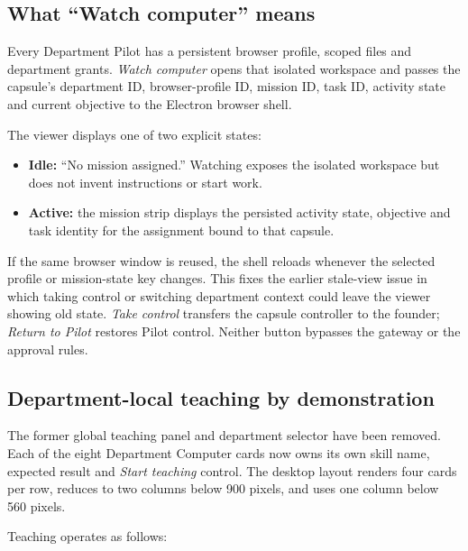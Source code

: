 \subsection*{What ``Watch computer'' means}

Every Department Pilot has a persistent browser profile, scoped files and
department grants. \emph{Watch computer} opens that isolated workspace and
passes the capsule's department ID, browser-profile ID, mission ID, task ID,
activity state and current objective to the Electron browser shell.

The viewer displays one of two explicit states:

\begin{itemize}[leftmargin=*]
\item \textbf{Idle:} ``No mission assigned.'' Watching exposes the isolated
workspace but does not invent instructions or start work.
\item \textbf{Active:} the mission strip displays the persisted activity state,
objective and task identity for the assignment bound to that capsule.
\end{itemize}

If the same browser window is reused, the shell reloads whenever the selected
profile or mission-state key changes. This fixes the earlier stale-view issue
in which taking control or switching department context could leave the viewer
showing old state. \emph{Take control} transfers the capsule controller to the
founder; \emph{Return to Pilot} restores Pilot control. Neither button bypasses
the gateway or the approval rules.

\subsection*{Department-local teaching by demonstration}

The former global teaching panel and department selector have been removed.
Each of the eight Department Computer cards now owns its own skill name,
expected result and \emph{Start teaching} control. The desktop layout renders
four cards per row, reduces to two columns below 900 pixels, and uses one
column below 560 pixels.

Teaching operates as follows:

